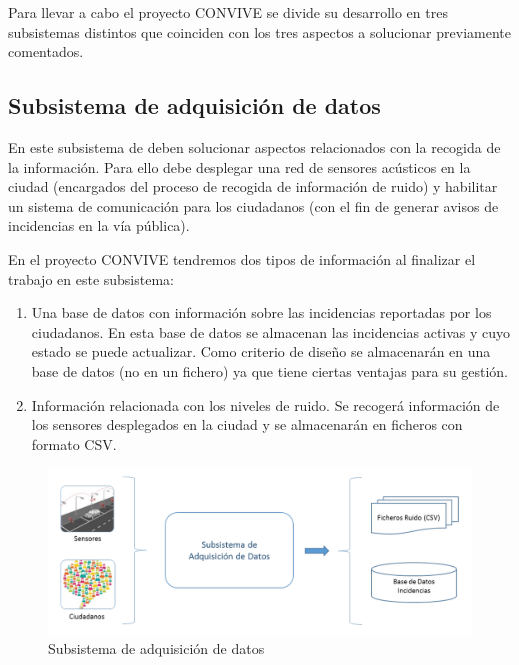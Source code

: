 \documentclass[
  a4paper,
]{scrreport}
\providecommand{\tightlist}{%
  \setlength{\itemsep}{0pt}\setlength{\parskip}{0pt}}\usepackage{longtable,booktabs,array}
\begin{document}
Para llevar a cabo el proyecto CONVIVE se divide su desarrollo en tres
subsistemas distintos que coinciden con los tres aspectos a solucionar
previamente comentados.

\hypertarget{subsistema-de-adquisiciuxf3n-de-datos}{%
\subsection{Subsistema de adquisición de
datos}\label{subsistema-de-adquisiciuxf3n-de-datos}}

En este subsistema de deben solucionar aspectos relacionados con la
recogida de la información. Para ello debe desplegar una red de sensores
acústicos en la ciudad (encargados del proceso de recogida de
información de ruido) y habilitar un sistema de comunicación para los
ciudadanos (con el fin de generar avisos de incidencias en la vía
pública).

En el proyecto CONVIVE tendremos dos tipos de información al finalizar
el trabajo en este subsistema:

\begin{enumerate}
\def\labelenumi{\arabic{enumi}.}
\tightlist
\item
  Una base de datos con información sobre las incidencias reportadas por
  los ciudadanos. En esta base de datos se almacenan las incidencias
  activas y cuyo estado se puede actualizar. Como criterio de diseño se
  almacenarán en una base de datos (no en un fichero) ya que tiene
  ciertas ventajas para su gestión.
\item
  Información relacionada con los niveles de ruido. Se recogerá
  información de los sensores desplegados en la ciudad y se almacenarán
  en ficheros con formato CSV.
\end{enumerate}

\begin{figure}

{\centering \includegraphics{../img/convive/subsistema-adquisicion-datos.png}

}

\caption{Subsistema de adquisición de datos}

\end{figure}
\end{document}

